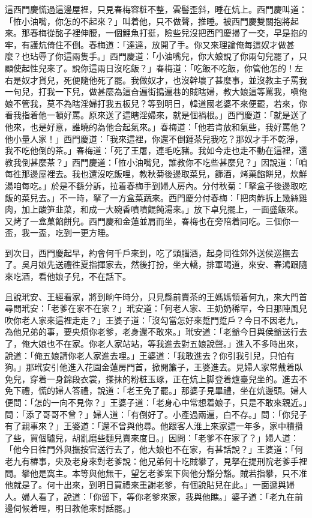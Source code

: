 這西門慶慌過這邊屋裡，只見春梅容粧不整，雲髻歪斜，睡在炕上。西門慶叫道：「恠小油嘴，你怎的不起來？」叫着他，只不做聲，推睡。被西門慶雙關抱將起來。那春梅從酩子裡伸腰，一個鯉魚打挺，險些兒沒把西門慶掃了一交，早是抱的牢，有護炕倚住不倒。春梅道：「達達，放開了手。你又來理論俺每這奴才做甚麼？也玷辱了你這兩隻手。」{}西門慶道：「小油嘴兒，你大娘說了你兩句兒罷了，只顧使起性兒來了。說你這兩日沒吃飯？」春梅道：「吃飯不吃飯，你管他怎的！左右是奴才貨兒，死便隨他死了罷。我做奴才，也沒幹壞了甚麼事，並沒教主子罵我一句兒，打我一下兒，做甚麼為這㒲遍街搗遍巷的賊瞎婦，教大娘這等罵我，嗔俺娘不管我，莫不為瞎淫婦打我五板兒？{}等到明日，韓道國老婆不來便罷，若來，你看我指着他一頓好罵。原來送了這瞎淫婦來，就是個禍根。」西門慶道：「就是送了他來，也是好意，誰曉的為他合起氣來。」春梅道：「他若肯放和氣些，我好罵他？他小量人家！」西門慶道：「我來這裡，你還不倒鍾茶兒我吃？那奴才手不乾淨，我不吃他倒的茶。」春梅道：「死了王屠，連毛吃豬。我如今走也走不動在這裡，還教我倒甚麼茶？」西門慶道：「恠小油嘴兒，誰教你不吃些甚麼兒？」因說道：「咱每徃那邊屋裡去。我也還沒吃飯哩，教秋菊後邊取菜兒，篩酒，烤菓餡餅兒，炊鮮湯咱每吃。」於是不繇分訴，拉着春梅手到婦人房內。分付秋菊：「拏盒子後邊取吃飯的菜兒去。」不一時，拏了一方盒菜蔬來。西門慶分付春梅：「把肉鮓拆上幾絲雞肉，加上酸笋韭菜，和成一大碗香噴噴餛飩湯來。」放下卓兒擺上，一面盛飯來。又烤了一盒菓餡餅兒。西門慶和金蓮並肩而坐，春梅也在旁陪着同吃。三個你一盃，我一盃，吃到一更方睡。

到次日，西門慶起早，約會何千戶來到，吃了頭腦酒，起身同徃郊外送侯巡撫去了。吳月娘先送禮徃夏指揮家去，然後打扮，坐大轎，排軍喝道，來安、春鴻跟隨來吃酒，看他娘子兒，不在話下。

且說玳安、王經看家，將到晌午時分，只見縣前賣茶的王媽媽領着何九，來大門首尋問玳安：「老爹在家不在家？」玳安道：「何老人家、王奶奶稀罕，今日那陣風兒吹你老人家來這裡走走？」王婆子道：「沒勾當怎好來踅門踅戶？今日不因老九，為他兄弟的事，要央煩你老爹，老身還不敢來。」玳安道：「老爺今日與侯爺送行去了，俺大娘也不在家。你老人家站站，等我進去對五娘說聲。」進入不多時出來，說道：「俺五娘請你老人家進去哩。」王婆道：「我敢進去？你引我引兒，只怕有狗。」那玳安引他進入花園金蓮房門首，掀開簾子，王婆進去。見婦人家常戴着臥免兒，穿着一身錦段衣裳，搽抹的粉粧玉琢，正在炕上脚登着爐臺兒坐的。進去不免下禮，慌的婦人答禮，說道：「老王免了罷。」{}那婆子見畢禮，坐在炕邊頭。婦人便問：「怎的一向不見你？」王婆子道：「老身心中常想着娘子，只是不敢來親近。」問：「添了哥哥不曾？」婦人道：「有倒好了。小產過兩遍，白不存。」問：「你兒子有了親事來？」王婆道：「還不曾與他尋。他跟客人淮上來家這一年多，家中積攢了些，買個驢兒，胡亂磨些麵兒賣來度日。」因問：「老爹不在家了？」婦人道：「他今日徃門外與撫按官送行去了，他大娘也不在家，有甚話說？」王婆道：「何老九有樁事，央及老身來對老爹說：他兄弟何十吃賊攀了，{}見拏在提刑院老爹手裡問。攀他是窩主。本等與他無干，望乞老爹案下與他分豁分豁。賊若指攀，只不准他就是了。何十出來，到明日買禮來重謝老爹，有個說貼兒在此。」一面遞與婦人。婦人看了，說道：「你留下，等你老爹來家，我與他瞧。」婆子道：「老九在前邊伺候着哩，明日教他來討話罷。」


